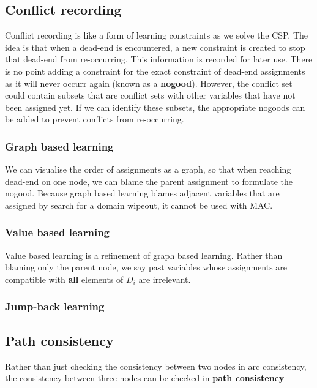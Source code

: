 \documentclass[CS4402-Notes.tex]{subfiles}
\begin{document}
\subsection{Conflict recording}
Conflict recording is like a form of learning constraints as we solve the CSP. The idea is that when a dead-end is encountered, a new constraint is created to stop that dead-end from re-occurring. This information is recorded for later use. There is no point adding a constraint for the exact constraint of dead-end assignments as it will never occurr again (known as a \textbf{nogood}). However, the conflict set could contain subsets that are conflict sets with other variables that have not been assigned yet. If we can identify these subsets, the appropriate nogoods can be added to prevent conflicts from re-occurring.

\subsubsection{Graph based learning}
We can visualise the order of assignments as a graph, so that when reaching dead-end on one node, we can blame the parent assignment to formulate the nogood. Because graph based learning blames adjacent variables that are assigned by search for a domain wipeout, it cannot be used with MAC.

\subsubsection{Value based learning}
Value based learning is a refinement of graph based learning. Rather than blaming only the parent node, we say past variables whose assignments are compatible with \textbf{all} elements of $D_i$ are irrelevant.

\subsubsection{Jump-back learning}

\subsection{Path consistency}
Rather than just checking the consistency between two nodes in arc consistency, the consistency between three nodes can be checked in \textbf{path consistency}
\end{document}
